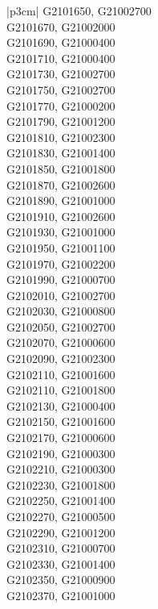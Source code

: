 \begin{customLongTable}{ |p{3cm}| }
G2101650, G21002700 \\ \hline
G2101670, G21002000 \\ \hline
G2101690, G21000400 \\ \hline
G2101710, G21000400 \\ \hline
G2101730, G21002700 \\ \hline
G2101750, G21002700 \\ \hline
G2101770, G21000200 \\ \hline
G2101790, G21001200 \\ \hline
G2101810, G21002300 \\ \hline
G2101830, G21001400 \\ \hline
G2101850, G21001800 \\ \hline
G2101870, G21002600 \\ \hline
G2101890, G21001000 \\ \hline
G2101910, G21002600 \\ \hline
G2101930, G21001000 \\ \hline
G2101950, G21001100 \\ \hline
G2101970, G21002200 \\ \hline
G2101990, G21000700 \\ \hline
G2102010, G21002700 \\ \hline
G2102030, G21000800 \\ \hline
G2102050, G21002700 \\ \hline
G2102070, G21000600 \\ \hline
G2102090, G21002300 \\ \hline
G2102110, G21001600 \\ \hline
G2102110, G21001800 \\ \hline
G2102130, G21000400 \\ \hline
G2102150, G21001600 \\ \hline
G2102170, G21000600 \\ \hline
G2102190, G21000300 \\ \hline
G2102210, G21000300 \\ \hline
G2102230, G21001800 \\ \hline
G2102250, G21001400 \\ \hline
G2102270, G21000500 \\ \hline
G2102290, G21001200 \\ \hline
G2102310, G21000700 \\ \hline
G2102330, G21001400 \\ \hline
G2102350, G21000900 \\ \hline
G2102370, G21001000 \\ \hline

\end{customLongTable}
